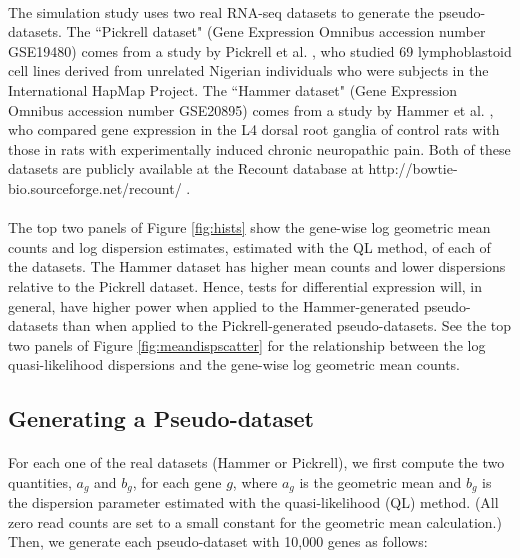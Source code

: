 \documentclass[10pt]{article}
\begin{document}
\paragraph{} \indent The simulation study uses two real RNA-seq datasets to generate the pseudo-datasets. The ``Pickrell dataset" (Gene Expression Omnibus accession number GSE19480) comes from a study by Pickrell et al. \cite{pickrell}, who studied 69 lymphoblastoid cell lines derived from unrelated Nigerian individuals who were subjects in the International HapMap Project. The ``Hammer dataset" (Gene Expression Omnibus accession number GSE20895) comes from a study by Hammer et al. \cite{hammer}, who compared gene expression in the L4 dorsal root ganglia of control rats with those in rats with experimentally induced chronic neuropathic pain. Both of these datasets are publicly available at the Recount database at {http://bowtie-bio.sourceforge.net/recount/} \cite{recount}.

\paragraph{} \indent The top two panels of Figure \ref{fig:hists} show the gene-wise log geometric mean counts and log dispersion estimates, estimated with the QL method, of each of the datasets. The Hammer dataset has higher mean counts and lower dispersions relative to the Pickrell dataset. Hence, tests for differential expression will, in general, have higher power when applied to the Hammer-generated pseudo-datasets than when applied to the Pickrell-generated pseudo-datasets. See the top two panels of Figure \ref{fig:meandispscatter} for the relationship between the log quasi-likelihood dispersions and the gene-wise log geometric mean counts.

\subsection*{Generating a Pseudo-dataset}

\paragraph{} \indent For each one of the real datasets (Hammer or Pickrell), we first compute the two quantities, $a_g$ and $b_g$, for each gene $g$, where $a_g$ is the geometric mean and $b_g$ is the dispersion parameter estimated with the quasi-likelihood (QL) method. (All zero read counts are set to a small constant for the geometric mean calculation.) Then, we generate each pseudo-dataset with 10,000 genes as follows:
\end{document}
